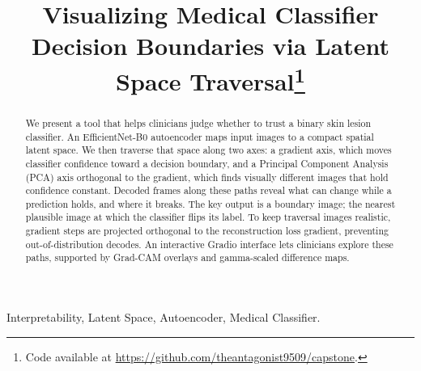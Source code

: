 \documentclass[conference,compsoc]{IEEEtran}
\begin{document}
\title{Visualizing Medical Classifier Decision Boundaries via Latent Space Traversal\thanks{Code available at \protect\url{https://github.com/theantagonist9509/capstone}.}}

\author{
    \and
{}
\and
{}
\and

    \and
}

\maketitle

\begin{abstract}
We present a tool that helps clinicians judge whether to trust a binary skin lesion classifier. An EfficientNet-B0 autoencoder maps input images to a compact spatial latent space. We then traverse that space along two axes: a gradient axis, which moves classifier confidence toward a decision boundary, and a Principal Component Analysis (PCA) axis orthogonal to the gradient, which finds visually different images that hold confidence constant. Decoded frames along these paths reveal what can change while a prediction holds, and where it breaks. The key output is a boundary image; the nearest plausible image at which the classifier flips its label. To keep traversal images realistic, gradient steps are projected orthogonal to the reconstruction loss gradient, preventing out-of-distribution decodes. An interactive Gradio interface lets clinicians explore these paths, supported by Grad-CAM overlays and gamma-scaled difference maps. 
\end{abstract}
\begin{IEEEkeywords}
Interpretability, Latent Space, Autoencoder, Medical Classifier.
\end{IEEEkeywords}
\end{document}
